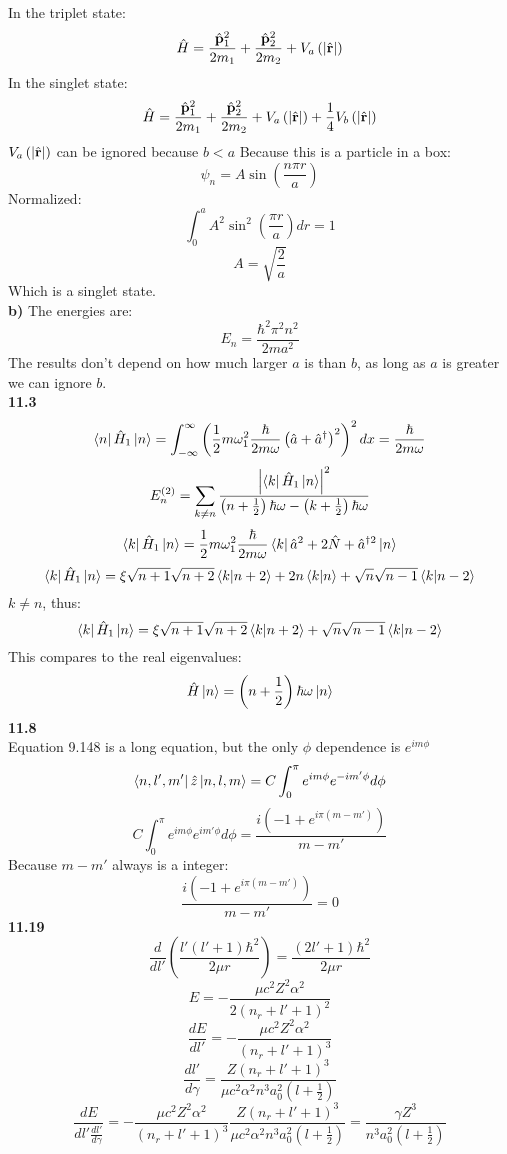\documentclass[english]{article}
\begin{document}
\begin{multicols}{2}
In the triplet state:
$$\hat{H}=\frac{\hat{\vb{p}}_1^2}{2m_1}+\frac{\hat{\vb{p}}_2^2}{2m_2}+V_a\left(|\hat{\vb{r}}|\right)$$
In the singlet state:
$$\hat{H}=\frac{\hat{\vb{p}}_1^2}{2m_1}+\frac{\hat{\vb{p}}_2^2}{2m_2}+V_a\left(|\hat{\vb{r}}|\right)+\frac{1}{4}V_b\left(|\hat{\vb{r}}|\right)$$
$V_a\left(|\hat{\vb{r}}|\right)$ can be ignored because $b<a$
Because this is a particle in a box:
$$\psi_n=A\sin\left(\frac{n\pi r}{a}\right)$$
Normalized:
$$\int_0^{a}A^2\sin^2\left(\frac{\pi r}{a}\right)dr=1$$
$$A=\sqrt{\frac{2}{a}}$$
Which is a singlet state.\\
\textbf{b)}
The energies are:
$$E_n=\frac{\hbar^2\pi^2n^2}{2ma^2}$$
The results don't depend on how much larger $a$ is than $b$, as long as $a$ is greater we can ignore $b$.\\
\noindent
\textbf{11.3}\\
$$\bra{n}\hat{H}_1\ket{n}=\int_{-\infty}^{\infty}\left(\frac{1}{2}m\omega_1^2\frac{\hbar}{2m\omega}\left(\hat{a}+\hat{a}^{\dag}\right)^2\right)^2dx=\frac{\hbar}{2m\omega}$$
$$E^{(2)}_n=\sum_{k\neq n}\frac{\left|\bra{k}\hat{H}_1\ket{n}\right|^2}{\left(n+\frac{1}{2}\right)\hbar\omega-\left(k+\frac{1}{2}\right)\hbar\omega}$$
$$\bra{k}\hat{H}_1\ket{n}=\frac{1}{2}m\omega_1^2\frac{\hbar}{2m\omega}\bra{k}\hat{a}^2+2\hat{N}+\hat{a}^{\dagger 2}\ket{n}$$
$$\bra{k}\hat{H}_1\ket{n}=\xi\sqrt{n+1}\sqrt{n+2}\bra{k}\ket{n+2}+2n\bra{k}\ket{n}+\sqrt{n}\sqrt{n-1}\bra{k}\ket{n-2}$$
$k\neq n$, thus:
$$\bra{k}\hat{H}_1\ket{n}=\xi\sqrt{n+1}\sqrt{n+2}\bra{k}\ket{n+2}+\sqrt{n}\sqrt{n-1}\bra{k}\ket{n-2}$$
This compares to the real eigenvalues:
$$\hat{H}\ket{n}=\left(n+\frac{1}{2}\right)\hbar\omega\ket{n}$$
\noindent
\textbf{11.8}\\
Equation 9.148 is a long equation, but the only $\phi$ dependence is $e^{im\phi}$
$$\bra{n,l',m'}\hat{z}\ket{n,l,m}=C\int_{0}^{\pi}e^{im\phi}e^{-im'\phi}d\phi$$
$$C\int_{0}^{\pi}e^{im\phi}e^{im'\phi}d\phi=\frac{i\left(-1+e^{i\pi(m-m')}\right)}{m-m'}$$
Because $m-m'$ always is a integer:
$$\frac{i\left(-1+e^{i\pi(m-m')}\right)}{m-m'}=0$$
\noindent
\textbf{11.19}\\
$$\frac{d}{dl'}\left(\frac{l'\left(l'+1\right)\hbar^2}{2\mu r}\right)=\frac{\left(2l'+1\right)\hbar^2}{2\mu r}$$
$$E=-\frac{\mu c^2Z^2\alpha^2}{2\left(n_r+l'+1\right)^2}$$
$$\frac{dE}{dl'}=-\frac{\mu c^2Z^2\alpha^2}{\left(n_r+l'+1\right)^3}$$
$$\frac{dl'}{d\gamma}=\frac{Z\left(n_r+l'+1\right)^3}{\mu c^2\alpha^2n^3a^2_0(l+\tfrac{1}{2})}$$
$$\frac{dE}{dl'\frac{dl'}{d\gamma}}=-\frac{\mu c^2Z^2\alpha^2}{\left(n_r+l'+1\right)^3}\frac{Z\left(n_r+l'+1\right)^3}{\mu c^2\alpha^2n^3a^2_0(l+\tfrac{1}{2})}=\frac{\gamma Z^3}{n^3a^2_0(l+\tfrac{1}{2})}$$
\end{multicols}
\end{document}
